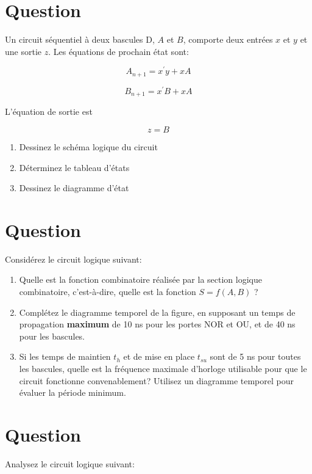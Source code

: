\documentclass[letter, oneside]{book}
\begin{document}
\section*{Question}
\label{sec:org7ae083f}
Un circuit séquentiel à deux bascules D, \(A\) et \(B\), comporte
  deux entrées \(x\) et \(y\) et une sortie \(z\). Les équations de
  prochain état sont:

$$A_{n+1} = x^\prime y + x A$$

$$B_{n+1} = x^\prime B + x A$$

L'équation de sortie est 

$$z=B$$

\begin{enumerate}
\item Dessinez le schéma logique du circuit

\item Déterminez le tableau d'états

\item Dessinez le diagramme d'état
\end{enumerate}

\section*{Question}
\label{sec:org23f310c}
 Considérez le circuit logique suivant:
\begin{center}

\end{center}

\begin{enumerate}
\item Quelle est la fonction combinatoire réalisée par la section
logique combinatoire, c'est-à-dire, quelle est la fonction \(S =
         f(A,B)\) ?

\item Complétez le diagramme temporel de la figure, en supposant un
temps de propagation \textbf{maximum} de 10 ns pour les portes NOR et OU,
et de 40 ns pour les bascules.

\item Si les temps de maintien \(t_{h}\) et de mise en place \(t_{su}\)
sont de 5 ns pour toutes les bascules, quelle est la fréquence
maximale d'horloge utilisable pour que le circuit fonctionne
convenablement? Utilisez un diagramme temporel pour évaluer la
période minimum.
\end{enumerate}

\section*{Question}
\label{sec:org1263e88}
 Analysez le circuit logique suivant:
\begin{center}

\end{center}
\end{document}

